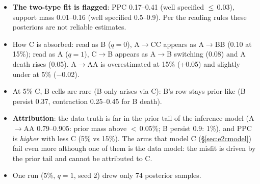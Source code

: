 \documentclass[10pt,a4paper]{article}
\newcommand{\blk}[1]{\par\needspace{5\baselineskip}\smallskip{\sffamily\bfseries\color{inkgray}#1}\par}
\newcommand{\Comment}{\blk{Comment}}
\begin{document}
\Comment
\begin{itemize}
\item \textbf{The two-type fit is flagged}: PPC 0.17--0.41 (well specified $\le$\,0.03), support mass 0.01--0.16 (well specified 0.5--0.9). Per the reading rules these posteriors are not reliable estimates.
\item How C is absorbed: read as B ($q=0$), A$\to$CC appears as A$\to$BB (0.10 at 15\%); read as A ($q=1$), C$\to$B appears as A$\to$B switching (0.08) and A death rises (0.05). A$\to$AA is overestimated at 15\% (+0.05) and slightly under at 5\% ($-0.02$).
\item At 5\% C, B cells are rare (B only arises via C): B's row stays prior-like (B persist 0.37, contraction 0.25--0.45 for B death).
\item \textbf{Attribution}: the data truth is far in the prior tail of the inference model (A$\to$AA 0.79--0.905: prior mass above $<$\,0.05\%; B persist 0.9: 1\%), and PPC is \emph{higher} with less C (5\% vs 15\%). The arms that model C (\S\ref{sec:e2cmodel}) fail even more although one of them is the data model: the misfit is driven by the prior tail and cannot be attributed to C.
\item One run (5\%, $q=1$, seed 2) drew only 74 posterior samples.
\end{itemize}

\end{document}
